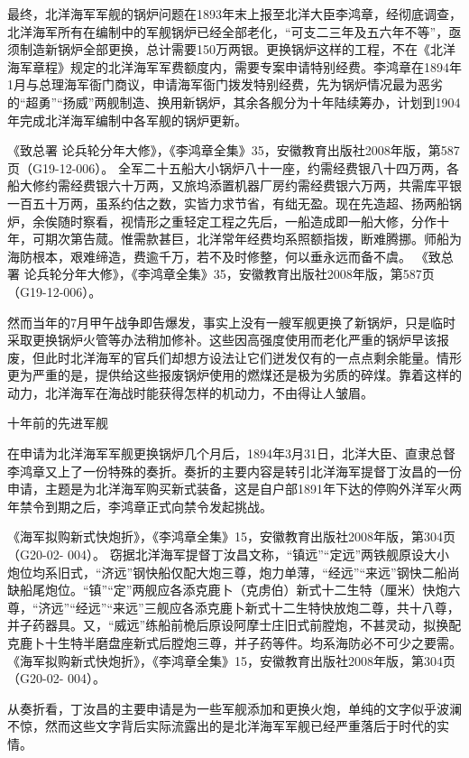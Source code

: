 \documentclass[12pt,UTF8]{ctexbook}
\begin{document}
最终，北洋海军军舰的锅炉问题在1893年末上报至北洋大臣李鸿章，经彻底调查，北洋海军所有在编制中的军舰锅炉已经全部老化，“可支二三年及五六年不等”，亟须制造新锅炉全部更换，总计需要150万两银。更换锅炉这样的工程，不在《北洋海军章程》规定的北洋海军军费额度内，需要专案申请特别经费。李鸿章在1894年1月与总理海军衙门商议，申请海军衙门拨发特别经费，先为锅炉情况最为恶劣的“超勇”“扬威”两舰制造、换用新锅炉，其余各舰分为十年陆续筹办，计划到1904年完成北洋海军编制中各军舰的锅炉更新。

《致总署 论兵轮分年大修》，《李鸿章全集》35，安徽教育出版社2008年版，第587页（G19-12-006）。
全军二十五船大小锅炉八十一座，约需经费银八十四万两，各船大修约需经费银六十万两，又旅坞添置机器厂房约需经费银六万两，共需库平银一百五十万两，虽系约估之数，实皆力求节省，有绌无盈。现在先造超、扬两船锅炉，余俟随时察看，视情形之重轻定工程之先后，一船造成即一船大修，分作十年，可期次第告蒇。惟需款甚巨，北洋常年经费均系照额指拨，断难腾挪。师船为海防根本，艰难缔造，费逾千万，若不及时修整，何以垂永远而备不虞。 《致总署 论兵轮分年大修》，《李鸿章全集》35，安徽教育出版社2008年版，第587页（G19-12-006）。

然而当年的7月甲午战争即告爆发，事实上没有一艘军舰更换了新锅炉，只是临时采取更换锅炉火管等办法稍加修补。这些因高强度使用而老化严重的锅炉早该报废，但此时北洋海军的官兵们却想方设法让它们迸发仅有的一点点剩余能量。情形更为严重的是，提供给这些报废锅炉使用的燃煤还是极为劣质的碎煤。靠着这样的动力，北洋海军在海战时能获得怎样的机动力，不由得让人皱眉。

十年前的先进军舰

在申请为北洋海军军舰更换锅炉几个月后，1894年3月31日，北洋大臣、直隶总督李鸿章又上了一份特殊的奏折。奏折的主要内容是转引北洋海军提督丁汝昌的一份申请，主题是为北洋海军购买新式装备，这是自户部1891年下达的停购外洋军火两年禁令到期之后，李鸿章正式向禁令发起挑战。

《海军拟购新式快炮折》，《李鸿章全集》15，安徽教育出版社2008年版，第304页（G20-02- 004）。
窃据北洋海军提督丁汝昌文称，“镇远”“定远”两铁舰原设大小炮位均系旧式，“济远”钢快船仅配大炮三尊，炮力单薄，“经远”“来远”钢快二船尚缺船尾炮位。“镇”“定”两舰应各添克鹿卜（克虏伯）新式十二生特（厘米）快炮六尊，“济远”“经远”“来远”三舰应各添克鹿卜新式十二生特快放炮二尊，共十八尊，并子药器具。又，“威远”练船前桅后原设阿摩士庄旧式前膛炮，不甚灵动，拟换配克鹿卜十生特半磨盘座新式后膛炮三尊，并子药等件。均系海防必不可少之要需。 《海军拟购新式快炮折》，《李鸿章全集》15，安徽教育出版社2008年版，第304页（G20-02- 004）。

从奏折看，丁汝昌的主要申请是为一些军舰添加和更换火炮，单纯的文字似乎波澜不惊，然而这些文字背后实际流露出的是北洋海军军舰已经严重落后于时代的实情。
\end{document}
